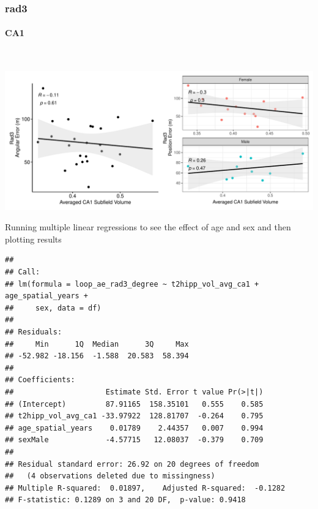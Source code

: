 \documentclass[
]{article}
\begin{document}
\newpage
\subsubsection{rad3}

\paragraph{CA1}

~ \vspace{1cm}

\includegraphics{hippocampal_subfield_files/figure-latex/unnamed-chunk-8-1.pdf}

\vspace{1cm}

Running multiple linear regressions to see the effect of age and sex and
then plotting results

\begin{verbatim}
## 
## Call:
## lm(formula = loop_ae_rad3_degree ~ t2hipp_vol_avg_ca1 + age_spatial_years + 
##     sex, data = df)
## 
## Residuals:
##     Min      1Q  Median      3Q     Max 
## -52.982 -18.156  -1.588  20.583  58.394 
## 
## Coefficients:
##                     Estimate Std. Error t value Pr(>|t|)
## (Intercept)         87.91165  158.35101   0.555    0.585
## t2hipp_vol_avg_ca1 -33.97922  128.81707  -0.264    0.795
## age_spatial_years    0.01789    2.44357   0.007    0.994
## sexMale             -4.57715   12.08037  -0.379    0.709
## 
## Residual standard error: 26.92 on 20 degrees of freedom
##   (4 observations deleted due to missingness)
## Multiple R-squared:  0.01897,    Adjusted R-squared:  -0.1282 
## F-statistic: 0.1289 on 3 and 20 DF,  p-value: 0.9418
\end{verbatim}
\end{document}
